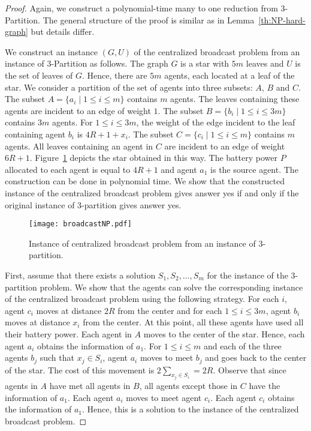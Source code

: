 \documentclass{article}
\newcommand\strat{\mbox{strategy}\xspace}
\begin{document}
\begin{proof}
Again, we construct a polynomial-time many to one reduction from 3-Partition. The general structure of the proof is similar as in Lemma~\ref{th:NP-hard-graph} but details differ.

We construct an instance $(G,U)$ of the centralized broadcast problem from an instance of 3-Partition as follows. The graph $G$ is a star with $5m$ leaves and $U$ is the set of leaves of $G$. Hence, there are $5m$ agents, each located at a leaf of the star.
We consider a partition of the set of agents into three subsets: $A$, $B$ and $C$. The subset $A=\{a_i\mid 1\leq i\leq m\}$ contains $m$ agents. The leaves containing these agents are incident to an edge of weight $1$. The subset $B=\{b_i\mid 1\leq i\leq 3m\}$ contains $3m$ agents. For  $1\leq i\leq 3m$, the weight of the edge incident to the leaf containing agent $b_i$ is $4R+1+x_i$. The subset $C=\{c_i\mid 1\leq i\leq m\}$ contains $m$ agents. All leaves containing an agent in $C$
are incident to an edge of weight $6R+1$. Figure~\ref{fig:reducb} depicts the star obtained in this way. The battery power $P$ allocated to each agent is equal to $4R+1$ and agent $a_1$ is the source agent. The construction can be done in polynomial time. We show that the constructed instance of the centralized broadcast problem gives answer yes if and only if the original instance of 3-partition gives answer yes.

\begin{figure}[h]
\centering
\texttt{[image: broadcastNP.pdf]}
\caption{Instance of centralized broadcast problem from an instance of 3-partition.}
\label{fig:reducb}
\end{figure}

First, assume that there exists a solution $S_1, S_2,\dots,S_m$ for the instance of the 3-partition problem. We show that the agents can solve the corresponding instance of the centralized broadcast problem using the following {\strat}. For each $i$, agent $c_i$ moves at distance $2R$ from the center and for each $1\leq i\leq 3m$, agent $b_i$ moves at distance $x_i$ from the center. At this point, all these agents have used all their battery power. Each agent in $A$ moves to the center of the star.
Hence, each agent $a_i$ obtains the information of $a_1$. For $1\leq i\leq m$ and each of the three agents $b_j$ such that $x_j\in S_i$, agent $a_i$ moves to meet $b_j$ and goes back to the center of the star. The cost of this movement is $2\sum_{x_j\in S_i}=2R$. Observe that since agents in $A$ have met all agents in $B$, all agents except those in $C$ have the information of $a_1$. Each agent $a_{i}$ moves to meet agent $c_i$. 
Each agent $c_i$ obtains the information of $a_1$. Hence, this is a solution to the instance of the centralized broadcast problem.


\end{proof}
\end{document}
